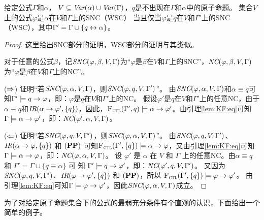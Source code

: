 \begin{proposition}\label{formulaNS_to_p}
	给定公式$\Gamma$和$\alpha$， $V \subseteq \textit{Var}(\alpha) \cup \textit{Var}(\Gamma)$，$q$是不出现在$\Gamma$和$\alpha$中的原子命题。
	集合$V$上的公式$\varphi$是$\alpha$在$V$和$\Gamma$上的SNC（WSC） 当且仅当$\varphi$是$q$在$V$和$\Gamma'$上的SNC（WSC），其中$\Gamma' = \Gamma \cup \{q \leftrightarrow \alpha\}$。
\end{proposition}
\begin{proof}
	这里给出SNC部分的证明，WSC部分的证明与其类似。
	
	对于任意的公式$\beta$，记$\emph{SNC}(\varphi,\beta,V,\Gamma)$为“$\varphi$是$\beta$在$V$和$\Gamma$上的SNC”，$\emph{NC}(\varphi,\beta,V,\Gamma)$为“$\varphi$是$\beta$在$V$和$\Gamma$上的NC”。
	
	
	($\Rightarrow$) 证明“若$\emph{SNC}(\varphi,\alpha,V,\Gamma)$，则$\emph{SNC}(\varphi,q,V,\Gamma')$”。
	由$\emph{SNC}(\varphi,\alpha,V,\Gamma)$和$\alpha\equiv q$可知$\Gamma' \models q\rightarrow \varphi$，即：$\varphi$是$q$在$V$和$\Gamma'$上的NC。
	假设$\varphi'$是$q$在$V$和$\Gamma'$上的任意NC，由于$\alpha\equiv q$和$\emph{IR}(\alpha \rightarrow \varphi', \{q\})$，因此，${\textsc{F}_{\textsc{ctl}}}(\Gamma',q)\models \alpha \rightarrow \varphi'$。由引理\ref{lem:KF:eq}可知$\Gamma \models \alpha \rightarrow \varphi'$，即：$\emph{NC}(\varphi',\alpha,V,\Gamma)$。
	
	
	($\Leftarrow$) 证明“若$\emph{SNC}(\varphi,q,V,\Gamma')$，则$\emph{SNC}(\varphi,\alpha,V,\Gamma)$”。
	由$\emph{SNC}(\varphi,q,V,\Gamma')$、$\emph{IR}(\alpha \rightarrow \varphi, \{q\})$ 和 $(\textbf{PP})$ 可知${\textsc{F}_{\textsc{ctl}}}(\Gamma', \{q\})\models \alpha \rightarrow \varphi$，又由引理\ref{lem:KF:eq}可知$\Gamma \models \alpha \rightarrow \varphi$，即：$\emph{NC}(\varphi,\alpha,V,\Gamma)$。
	设 $\varphi'$ 是 $\alpha$ 在 $V$ 和 $\Gamma$ 上的任意NC。由$\alpha\equiv q$ 和 $\Gamma'=\Gamma \cup \{q\equiv \alpha\}$ 可 知 $\Gamma' \models q \rightarrow \varphi'$，即：$\emph{NC}(\varphi',q,V,\Gamma')$。
	又因为$\emph{SNC}(\varphi,q,V,\Gamma')$、$\emph{IR}(\varphi \rightarrow \varphi', \{q\})$ 和 $(\textbf{PP})$，所以 ${\textsc{F}_{\textsc{ctl}}}(\Gamma', \{q\})\models \varphi \rightarrow \varphi'$。
	由引理\ref{lem:KF:eq}可知$\Gamma \models \varphi \rightarrow \varphi'$，因此$\emph{SNC}(\varphi,\alpha,V, \Gamma)$成立。
\end{proof}

为了对给定原子命题集合下的公式的最弱充分条件有个直观的认识，下面给出一个简单的例子。

